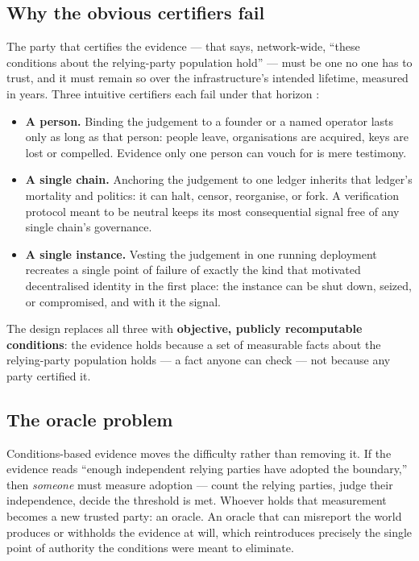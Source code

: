 \subsection{Why the obvious certifiers fail}

The party that certifies the evidence — that says, network-wide, ``these conditions about the relying-party population hold'' — must be one no one has to trust, and it must remain so over the infrastructure's intended lifetime, measured in years. Three intuitive certifiers each fail under that horizon \cite{ref28_techspec}:

\begin{itemize}
  \item \textbf{A person.} Binding the judgement to a founder or a named operator lasts only as long as that person: people leave, organisations are acquired, keys are lost or compelled. Evidence only one person can vouch for is mere testimony.
  \item \textbf{A single chain.} Anchoring the judgement to one ledger inherits that ledger's mortality and politics: it can halt, censor, reorganise, or fork. A verification protocol meant to be neutral keeps its most consequential signal free of any single chain's governance.
  \item \textbf{A single instance.} Vesting the judgement in one running deployment recreates a single point of failure of exactly the kind that motivated decentralised identity in the first place: the instance can be shut down, seized, or compromised, and with it the signal.
\end{itemize}

The design replaces all three with \textbf{objective, publicly recomputable conditions}: the evidence holds because a set of measurable facts about the relying-party population holds — a fact anyone can check — not because any party certified it.

\subsection{The oracle problem}
\label{subsec:oracle}

Conditions-based evidence moves the difficulty rather than removing it. If the evidence reads ``enough independent relying parties have adopted the boundary,'' then \emph{someone} must measure adoption — count the relying parties, judge their independence, decide the threshold is met. Whoever holds that measurement becomes a new trusted party: an oracle. An oracle that can misreport the world produces or withholds the evidence at will, which reintroduces precisely the single point of authority the conditions were meant to eliminate.

